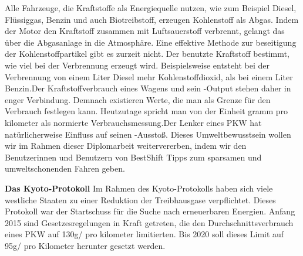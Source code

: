 Alle Fahrzeuge, die Kraftstoffe als Energiequelle nutzen, wie zum Beispiel Diesel, Flüssiggas, Benzin und auch Biotreibstoff, erzeugen Kohlenstoff als Abgas. Indem der Motor den Kraftstoff zusammen mit Luftsauerstoff verbrennt, gelangt das  über die Abgasanlage in die Atmosphäre. Eine effektive Methode zur beseitigung der Kohlenstoffpartikel gibt es zurzeit nicht. Der benutzte Kraftstoff bestimmt, wie viel  bei der Verbrennung erzeugt wird. Beispielsweise entsteht bei der Verbrennung von einem Liter Diesel mehr Kohlenstoffdioxid, als bei einem Liter Benzin.Der Kraftstoffverbrauch eines Wagens und sein -Output stehen daher in enger Verbindung. Demnach existieren Werte, die man als Grenze für den Verbrauch festlegen kann. Heutzutage spricht man von der Einheit gramm pro kilometer als normierte Verbrauchsmessung.Der Lenker eines PKW hat natürlicherweise Einfluss auf seinen -Ausstoß. Dieses Umweltbewusstsein wollen wir im Rahmen dieser Diplomarbeit weitervererben, indem wir den Benutzerinnen und Benutzern von BestShift Tipps zum sparsamen und umweltschonenden Fahren geben.

\textbf{Das Kyoto-Protokoll\nextline}
Im Rahmen des Kyoto-Protokolls haben sich viele westliche Staaten zu einer Reduktion der Treibhausgase verpflichtet. 
Dieses Protokoll war der Startschuss für die Suche nach erneuerbaren Energien. 
Anfang 2015 sind Gesetzesregelungen in Kraft getreten, die den Durchschnittsverbrauch eines PKW auf 130g/ pro kilometer limitierten. 
Bis 2020 soll dieses Limit auf 95g/ pro Kilometer herunter gesetzt werden.




\clearpage %